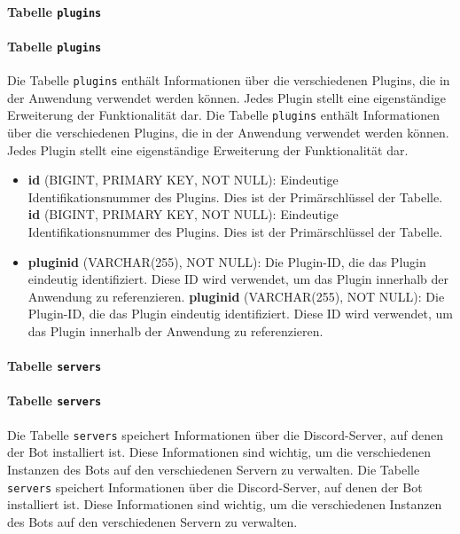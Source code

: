 \paragraph{\texorpdfstring{Tabelle \texttt{plugins}}{Tabelle plugins}}\label{tabelle-plugins}
\paragraph{\texorpdfstring{Tabelle \texttt{plugins}}{Tabelle plugins}}\label{tabelle-plugins}

Die Tabelle \texttt{plugins} enthält Informationen über die verschiedenen Plugins, die in der Anwendung verwendet werden können. Jedes Plugin stellt eine eigenständige Erweiterung der Funktionalität dar.
Die Tabelle \texttt{plugins} enthält Informationen über die verschiedenen Plugins, die in der Anwendung verwendet werden können. Jedes Plugin stellt eine eigenständige Erweiterung der Funktionalität dar.

\begin{itemize}
\item
  \textbf{id} (BIGINT, PRIMARY KEY, NOT NULL): Eindeutige Identifikationsnummer des Plugins. Dies ist der Primärschlüssel der Tabelle.
  \textbf{id} (BIGINT, PRIMARY KEY, NOT NULL): Eindeutige Identifikationsnummer des Plugins. Dies ist der Primärschlüssel der Tabelle.
\item
  \textbf{pluginid} (VARCHAR(255), NOT NULL): Die Plugin-ID, die das Plugin eindeutig identifiziert. Diese ID wird verwendet, um das Plugin innerhalb der Anwendung zu referenzieren.
  \textbf{pluginid} (VARCHAR(255), NOT NULL): Die Plugin-ID, die das Plugin eindeutig identifiziert. Diese ID wird verwendet, um das Plugin innerhalb der Anwendung zu referenzieren.
\end{itemize}

\paragraph{\texorpdfstring{Tabelle \texttt{servers}}{Tabelle servers}}\label{tabelle-servers}
\paragraph{\texorpdfstring{Tabelle \texttt{servers}}{Tabelle servers}}\label{tabelle-servers}

Die Tabelle \texttt{servers} speichert Informationen über die Discord-Server, auf denen der Bot installiert ist. Diese Informationen sind wichtig, um die verschiedenen Instanzen des Bots auf den verschiedenen Servern zu verwalten.
Die Tabelle \texttt{servers} speichert Informationen über die Discord-Server, auf denen der Bot installiert ist. Diese Informationen sind wichtig, um die verschiedenen Instanzen des Bots auf den verschiedenen Servern zu verwalten.

